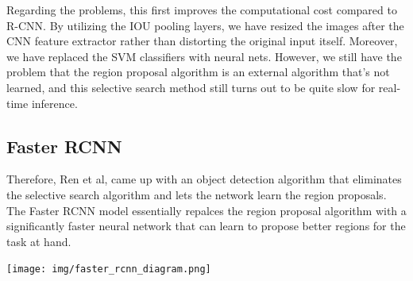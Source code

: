 \documentclass{article}
\theoremstyle{definition}
\theoremstyle{remark}
\theoremstyle{definition}
\begin{document}
    Regarding the problems, this first improves the computational cost compared to R-CNN. By utilizing the IOU pooling layers, we have resized the images after the CNN feature extractor rather than distorting the original input itself. Moreover, we have replaced the SVM classifiers with neural nets. However, we still have the problem that the region proposal algorithm is an external algorithm that's not learned, and this selective search method still turns out to be quite slow for real-time inference.  

  \subsection{Faster RCNN}

    Therefore, Ren et al, came up with an object detection algorithm that eliminates the selective search algorithm and lets the network learn the region proposals. The Faster RCNN model essentially repalces the region proposal algorithm with a significantly faster neural network that can learn to propose better regions for the task at hand. 
    \begin{center}
        \texttt{[image: img/faster\_rcnn\_diagram.png]}
    \end{center}
\end{document}
